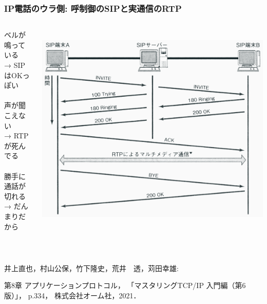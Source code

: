 \documentclass[
  lualatex,
  aspectratio=169,
  14pt
]{beamer}
\begin{document}
\begin{frame}
  \frametitle{IP電話のウラ側: 呼制御のSIPと実通信のRTP}

  \begin{columns}
    \begin{column}{.35\textwidth}
      ベルが鳴っている\\
      \hspace{1\zw}→ SIPはOKっぽい
      \\~\\[-.5\baselineskip]

      声が聞こえない\\
      \hspace{1\zw}→ RTPが死んでる
      \\~\\[-.5\baselineskip]

      勝手に通話が切れる\\
      \hspace{1\zw}→ だんまりだから
    \end{column}
    \begin{column}{.65\textwidth}
      \raggedleft
      ~\\[.2\baselineskip]
      \includegraphics[height=.9\textheight]{./images/sip.png}
    \end{column}
  \end{columns}

  ~\\[-.9\baselineskip]
  {\tiny\raggedright
  井上直也，村山公保，竹下隆史，荒井　透，苅田幸雄:\\[-1.5\baselineskip]
  \raggedright
  第8章 アプリケーションプロトコル，
  「マスタリングTCP/IP 入門編（第6版）」，
  p.334，
  株式会社オーム社，2021．}
  \\~\\[3\baselineskip]

  \note{ }
\end{frame}
\end{document}
